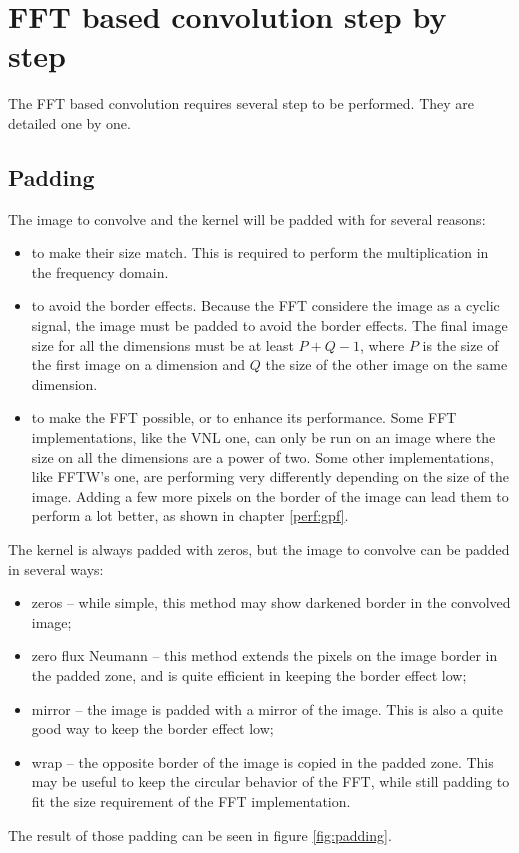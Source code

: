 \documentclass{InsightArticle}
\begin{document}
\section{FFT based convolution step by step}

The FFT based convolution requires several step to be performed. They are detailed one by one.

\subsection{Padding}

The image to convolve and the kernel will be padded with for several reasons:
\begin{itemize}
  \item to make their size match. This is required to perform the multiplication in the frequency
  domain.
  \item  to avoid the border effects. Because the FFT considere the image as a cyclic signal, the
  image must be padded to avoid the border effects. The final image size for all the dimensions
  must be at least $P+Q-1$, where $P$ is the size of the first image on a dimension and $Q$ the size
  of the other image on the same dimension.
  \item to make the FFT possible, or to enhance its performance. Some FFT implementations, like the
  VNL one, can only be run on an image where the size on all the dimensions are a power of two.
  Some other implementations, like FFTW's one, are performing very differently depending on the
  size of the image. Adding a few more pixels on the border of the image can lead them to perform
  a lot better, as shown in chapter \ref{perf:gpf}.
\end{itemize}

The kernel is always padded with zeros, but the image to convolve can be padded in several ways:
\begin{itemize}
 \item zeros -- while simple, this method may show darkened border in the convolved image;
 \item zero flux Neumann -- this method extends the pixels on the image border in the padded zone, and
       is quite efficient in keeping the border effect low;
 \item mirror -- the image is padded with a mirror of the image. This is also a quite good way to
       keep the border effect low;
 \item wrap -- the opposite border of the image is copied in the padded zone. This may be useful to
       keep the circular behavior of the FFT, while still padding to fit the size requirement of the
       FFT implementation.
\end{itemize}
The result of those padding can be seen in figure \ref{fig:padding}.
\end{document}
